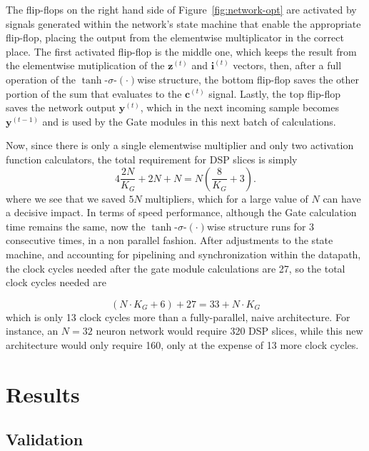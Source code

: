 \documentclass{IEEEtran}
\newcommand{\mb}[1]{\mathbf{#1}}
\begin{document}
The flip-flops on the right hand side of Figure~\ref{fig:network-opt} are activated by signals generated within the network's state machine that enable the appropriate flip-flop, placing the output from the elementwise multiplicator in the correct place. The first activated flip-flop is the middle one, which keeps the result from the elementwise mutiplication of the $\mb{z}^{(t)}$ and $\mb{i}^{(t)}$ vectors, then, after a full operation of the $\tanh$-$\sigma$-$(\cdot)$wise structure, the bottom flip-flop saves the other portion of the sum that evaluates to the $\mb{c}^{(t)}$ signal. Lastly, the top flip-flop saves the network output $\mb{y}^{(t)}$, which in the next incoming sample becomes $\mb{y}^{(t-1)}$ and is used by the Gate modules in this next batch of calculations.

Now, since there is only a single elementwise multiplier and only two activation function calculators, the total requirement for DSP slices is simply
\begin{equation}\label{eq:numdsp_network-opt}
    4\frac{2N}{K_G} + 2N + N = N \left( \frac{8}{K_G} + 3 \right).
\end{equation}
where we see that we saved $5N$ multipliers, which for a large value of $N$ can have a decisive impact. In terms of speed performance, although the Gate calculation time remains the same, now the $\tanh$-$\sigma$-$(\cdot)$wise structure runs for 3 consecutive times, in a non parallel fashion. After adjustments to the state machine, and accounting for pipelining and synchronization within the datapath, the clock cycles needed after the gate module calculations are 27, so the total clock cycles needed are

\begin{equation}\label{eq:numcc_network-opt}
    (N \cdot K_G + 6) + 27  = 33 + N\cdot K_G
\end{equation}
which is only 13 clock cycles more than a fully-parallel, naive architecture. For instance, an $N=32$ neuron network would
require 320 DSP slices, while this new architecture would only require 160, only at the expense of 13 more clock cycles.

\section{Results}\label{sec:results}

\subsection{Validation}\label{sec:res-val}
\end{document}
